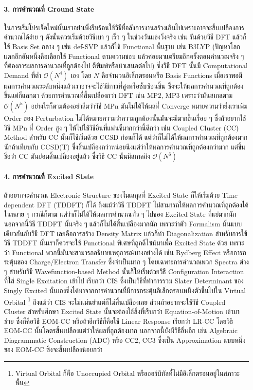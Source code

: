 \paragraph{3. การคำนวณที่ Ground State}
ในการเริ่มโปรเจ็คใหม่นั้นเราอย่าเพิ่งรีบร้อนใช้วิธีที่อลังการงานสร้างเกินไปเพราะอาจจะสิ้นเปลืองการคำนวณได้ง่าย ๆ ดังนั้นควรเริ่มด้วยวิธีเบา ๆ เร็ว ๆ
ในช่วงวันแข่งวิ่งจริง เช่น รันด้วยวิธี DFT แล้วก็ใช้ Basis Set กลาง ๆ เช่น def-SVP แล้วก็ใช้ Functional พื้นฐาน เช่น B3LYP
(ปัญหาโลกแตกอีกอันหนึ่งคือเลือกใช้ Functional ตามความชอบ แล้วค่อยมาเเตรียมอีกครั้งตอนคำนวณจริง ๆ ที่ต้องการผลการคำนวณที่ถูกต้องไป%
ตีพิมพ์หรือนำเสนอต่อไป) ซึ่งวิธี DFT นั้นมี Computational Demand ที่ต่ำ $\mathcal{O}(N^{4})$ เอง โดย $N$ คือจำนวนอิเล็กตรอนหรือ
Basis Functions เมื่อเราพอมีผลการคำนวณระดับหนึ่งแล้วเราอาจจะใช้วิธีการที่สูงหรือซับซ้อนขึ้น ซึ่งจะให้ผลการคำนวณที่ถูกต้องขึ้นแต่ก็แลกมา%
ด้วยการคำนวณที่สิ้นเปลืองกว่า DFT เช่น MP2, MP3 เพราะว่ามันสเกลตาม $\mathcal{O}(N^{5})$ อย่างไรก็ตามต้องอย่าลืมว่าวิธี MPn
มันไม่ได้ให้ผลที่ Converge หมายความว่ายิ่งเราเพิ่ม Order ของ Perturbation ไม่ได้หมายความว่าความถูกต้องนั้นมันจะมีมากขึ้นเรื่อย ๆ
ซึ่งถ้าอยากใช้วิธี MPn ที่ Order สูง ๆ ให้ไปใช้วิธีอื่นที่แฟนซีมากกว่านี้ดีกว่า เช่น Coupled Cluster (CC) Method สำหรับ CC นั้นก็ใช้เริ่มด้วย
CCSD ก่อนก็ได้ แต่ว่าก็ไม่ได้ให้ผลการคำนวณที่ถูกต้องมากนักถ้าเทียบกับ CCSD(T) ซึ่งสิ้นเปลืองกว่าหน่อยนึงแต่ว่าให้ผลการคำนวณที่ถูกต้องกว่ามาก
แต่ขึ้นชื่อว่า CC มันย่อมสิ้นเปลืองอยู่แล้ว ซึ่งวิธี CC นั้นมีสเกลถึง $\mathcal{O}(N^{6})$

\paragraph{4. การคำนวณที่ Excited State}
ถ้าอยากจะคำนวณ Electronic Structure ของโมเลกุลที่ Excited State ก็ให้เริ่มด้วย Time-dependent DFT (TDDFT) ก็ได้ ถึงแม้ว่าวิธี
TDDFT ไม่สามารถให้ผลการคำนวณที่ถูกต้องได้ในหลาย ๆ กรณีก็ตาม แต่ว่าก็ไม่ได้ให้ผลการคำนวณทั่ว ๆ ไปของ Excited State ที่แย่มากนัก
นอกจากนี้วิธี TDDFT นั้นจริง ๆ แล้วก็ไม่ได้สิ้นเปลืองมากนัก เพราะว่าตัว Formalism นั้นแบบเดียวกันกับวิธี DFT เลยคือการสร้าง Density Matrix
แล้วก็ทำ Diagonalization สำหรับการใช้วิธี TDDFT นั้นเราก็ควรจะใช้ Functional พิเศษที่ถูกดีไซน์มาเพื่อ Excited State ด้วย เพราะว่า
Functional พวกนี้มันจะสามารถอธิบายเหตุการณ์บางอย่างได้ เช่น Rydberg Effect หรือการกระตุ้นของ Charge/Electron Transfer
ซึ่งจำเป็นมาก ๆ โดยเฉพาะการคำนวณพวก Spectra ต่าง ๆ สำหรับวิธี Wavefunction-based Method นั้นก็ให้เริ่มด้วยวิธี Configuration
Interaction ที่ใส่ Single Excitation เข้าไป เรียกว่า CIS ซึ่งเป็นวิธีที่ทำการรวม Slater Determinant ของ Singly Excited
นั่นเองซึ่งได้มาจากการคำนวณที่มีการกระตุ้นอิเล็กตรอนหนึ่งตัวขึ้นไปใน Virtual Orbital \footnote{Virtual Orbital ก็คือ Unoccupied
  Orbital หรือออร์บิทัลที่ไม่มีอิเล็กตรอนอยู่ในสภาวะพื้น} ถึงแม้ว่า CIS จะไม่แม่นยำแต่ก็ไม่สิ้นเปลืองเลย ส่วนถ้าอยากจะใช้วิธี Coupled Cluster
สำหรับศึกษา Excited State นั้นจะต้องใช้สิ่งที่เรีบกว่า Equation-of-Motion เข้ามาช่วย ซึ่งก็คือวิธี EOM-CC หรือถ้าอีกวิธีก็คือใช้ Linear
Response เรียกว่า LR-CC โดยวิธี EOM-CC นั้นโคตรสิ้นเปลืองแต่ว่าให้ผลที่ถูกต้องมาก นอกจากนี้ยังมีวิธีอื่นอีก เช่น Algebraic Diagrammatic
Construction (ADC) หรือ CC2, CC3 ซึ่งเป็น Approximation แบบหนึ่งของ EOM-CC ซึ่งจะสิ้นเปลืองน้อยกว่า

